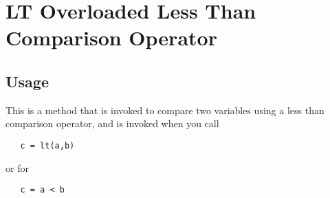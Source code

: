 \section{LT Overloaded Less Than Comparison Operator}

\subsection{Usage}

This is a method that is invoked to compare two variables using a
less than comparison operator, and is invoked when you call
\begin{verbatim}
   c = lt(a,b)
\end{verbatim}
or for 
\begin{verbatim}
   c = a < b
\end{verbatim}
